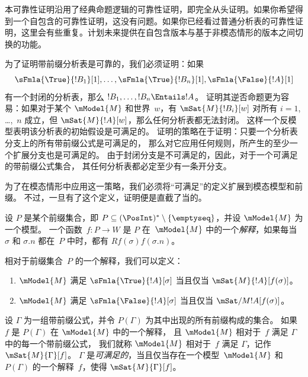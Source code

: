 \documentclass[../../../include/open-logic-section]{subfiles}
\begin{document}


\begin{editorial}
  本可靠性证明沿用了经典命题逻辑的可靠性证明，即完全从头证明。如果你希望得到一个自包含的可靠性证明，这没有问题。如果你已经看过普通分析表的可靠性证明，这里会有些重复。计划未来提供在自包含版本与基于非模态情形的版本之间切换的功能。
\end{editorial}

\begin{explain}
  为了证明带前缀分析表是可靠的，我们必须证明：如果
  \[
  \sFmla{\True}{!B_1}[1], \dots, \sFmla{\True}{!B_n}[1], \sFmla{\False}{!A}[1]
  \]
  有一个封闭的分析表，那么 $!B_1, \dots, !B_n \Entails !A$。
  证明其逆否命题更为容易：如果对于某个 $\mModel{M}$ 和世界~$w$，有 $\mSat{M}{!B_i}[w]$ 对所有 $i=1$, \dots,~$n$ 成立，但
  $\mSat{M}{!A}[w]$，那么任何分析表都无法封闭。
  这样一个反模型表明该分析表的初始假设是可满足的。
  证明的策略在于证明：只要一个分析表分支上的所有带前缀公式是可满足的，
  那么对它应用任何规则，所产生的至少一个扩展分支也是可满足的。
  由于封闭分支是不可满足的，因此，对于一个可满足的带前缀公式集合，
  其任何分析表都必定至少有一条开分支。

  为了在模态情形中应用这一策略，我们必须将“可满足”的定义扩展到模态模型和前缀。
  不过，一旦有了这个定义，证明便是直截了当的。
\end{explain}

\begin{defn}
  设 $P$ 是某个前缀集合，即 $P \subseteq (\PosInt)^*
  \setminus \{\emptyseq\}$，并设 $\mModel{M}$ 为一个模型。
  一个函数~$f\colon P \to W$ 是 $P$ 在~$\mModel{M}$ 中的一个\emph{解释}，如果每当 $\sigma$ 和 $\sigma.n$ 都在~$P$ 中时，都有 $Rf(\sigma)f(\sigma.n)$。

  相对于前缀集合~$P$ 的一个解释，我们可以定义：
  \begin{enumerate}
  \item $\mModel{M}$ 满足 $\sFmla{\True}{!A}[\sigma]$ 当且仅当
    $\mSat{M}{!A}[f(\sigma)]$。
  \item $\mModel{M}$ 满足 $\sFmla{\False}{!A}[\sigma]$ 当且仅当
    $\mSat/{M}{!A}[f(\sigma)]$。
  \end{enumerate}
\end{defn}

\begin{defn}
  设 $\Gamma$ 为一组带前缀公式，并令 $P(\Gamma)$ 为其中出现的所有前缀构成的集合。
  如果 $f$ 是 $P(\Gamma)$ 在 $\mModel{M}$ 中的一个解释，
  且 $\mModel{M}$ 相对于~$f$ 满足 $\Gamma$ 中的每一个带前缀公式，
  我们就称 $\mModel{M}$ 相对于~$f$ 满足 $\Gamma$，记作 $\mSat{M}{\Gamma}[f]$。
  $\Gamma$ 是\emph{可满足的}，当且仅当存在一个模型~$\mModel{M}$ 和 $P(\Gamma)$ 的一个解释~$f$，使得 $\mSat{M}{\Gamma}[f]$。
\end{defn}
\end{document}
